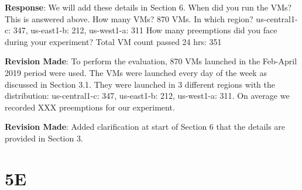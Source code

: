 \documentclass{article}
\newcommand{\resp}[1]{\textbf{Response}: #1}
\newcommand{\revmade}[1]{\textbf{Revision Made}: #1}
\begin{document}
\begin{enumerate}
\resp{We will add these details in Section 6.
When did you run the VMs? This is answered above.
How many VMs? 870 VMs.
In which region? us-central1-c: 347, us-east1-b: 212, us-west1-a: 311
How many preemptions did you face during your experiment? Total VM count passed 24 hrs: 351
}

\revmade{To perform the evaluation, 870 VMs launched in the Feb-April 2019 period were used. The VMs were launched every day of the week as discussed in Section 3.1. They were launched in 3 different regions with the distribution: us-central1-c: 347, us-east1-b: 212, us-west1-a: 311. On average we recorded XXX preemptions for our experiment.}

\revmade{Added clarification at start of Section 6 that the details are provided in Section 3.}

\end{enumerate}

\section{5E}
\end{document}
